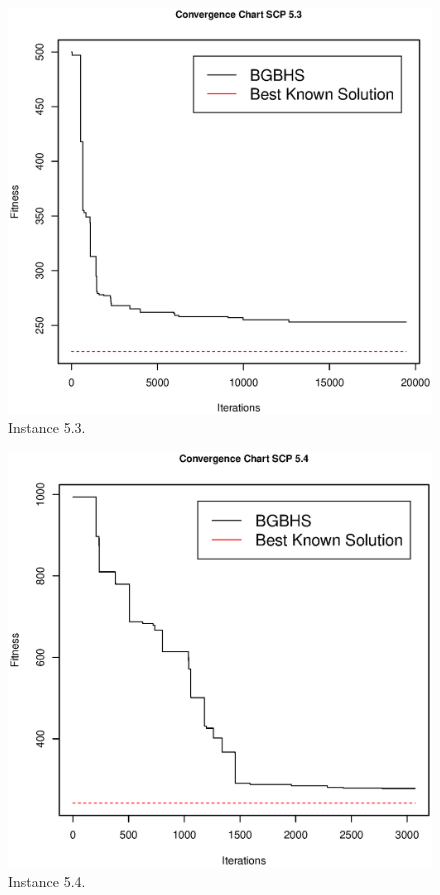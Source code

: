 \begin{figure}[]
\centering
\includegraphics[scale=.45]{Resultados/scp53.eps}
\caption{Instance 5.3.}
\label{fig:Instance.5.3}
\end{figure}
\begin{figure}[]
\centering
\includegraphics[scale=.45]{Resultados/scp54.eps}
\caption{Instance 5.4.}
\label{fig:Instance.5.4}
\end{figure}
